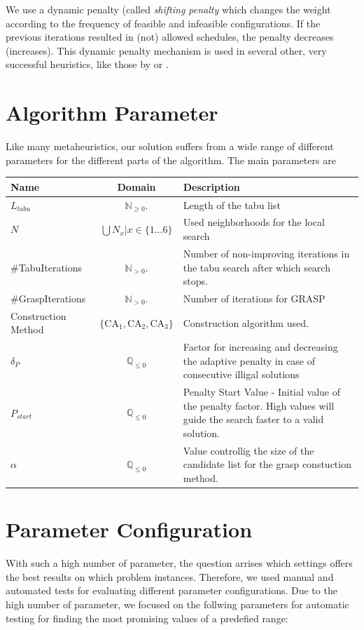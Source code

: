 \documentclass[a4paper,11pt]{article}
\begin{document}
We use a dynamic penalty (called \emph{shifting penalty} which changes the weight according to the frequency of feasible and infeasible configurations.
If the previous iterations resulted in (not) allowed schedules, the penalty decreases (increases).
This dynamic penalty mechanism is used in several other, very successful heuristics, like those by \cite{Anagnostopoulos06} or \cite{Gaspero07}.


\section{Algorithm Parameter}
Like many metaheuristics, our solution suffers from a wide range of different parameters for the different parts of the algorithm.
The main parameters are
\begin{center}
\begin{tabularx}{\linewidth}{| l | c | X | }
  \hline
  Name & Domain & Description \\   \hline     \hline
  $L_{tabu}$ & $\mathbb{N}_{\geq0}.$ & Length of the tabu list \\ \hline
  $N$ & $\bigcup N_x  | x \in \{1...6\}$ & Used neighborhoods for the local search \\ \hline
  \#TabuIterations &  $\mathbb{N}_{ > 0}.$ & Number of non-improving iterations in the tabu search after which search stops. \\ \hline
  \#GraspIterations &  $\mathbb{N}_{> 0}.$ & Number of iterations for \ac{GRASP} \\ \hline
  Construction Method &  $\{\text{CA}_1, \text{CA}_2, \text{CA}_3\}$ & Construction algorithm used.\\ \hline
  $ \delta_P $ &  $\mathbb{Q}_{\leq0}$ & Factor for increasing and decreasing the adaptive penalty in case of consecutive illigal solutions\\ \hline
  $P_{start}$ &  $\mathbb{Q}_{\leq0}$ &Penalty Start Value -  Initial value of the penalty factor. High values will guide the search faster to a valid solution.\\ \hline
  $\alpha$ & $\mathbb{Q}_{\leq0}$ & Value controllig the size of the candidate list for the grasp constuction method. \\ \hline
\end{tabularx}
\end{center}

\section{Parameter Configuration}
With such a high number of parameter, the question arrises which settings offers the best results on which problem instances. Therefore, we used manual and
automated tests for evaluating different parameter configurations.
Due to the high number of parameter, we focused on the follwing parameters for automatic testing for finding the most promising values of a predefied range:
\end{document}
